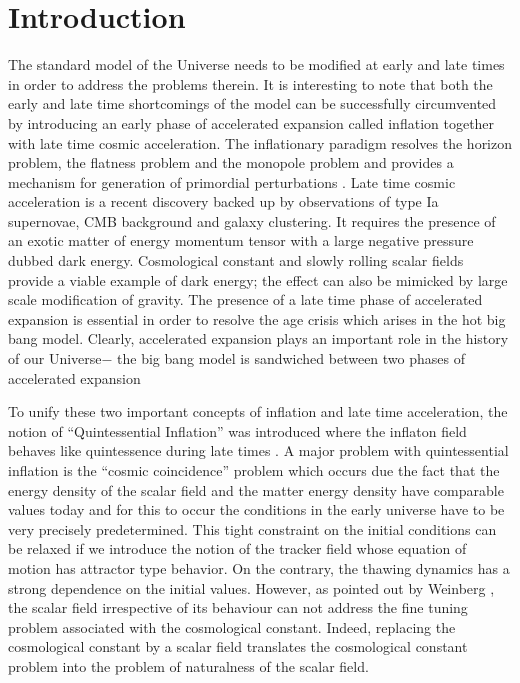 \documentclass[prd,twocolumn,superscriptaddress]{revtex4}
\begin{document}
\section{Introduction}
The standard model of the Universe needs to be modified at early and late times in order to 
address the problems therein. It is interesting to note that both the early and late time shortcomings
of the model can  be successfully  circumvented by introducing an
early phase of accelerated expansion called inflation together with
late time cosmic acceleration. The inflationary paradigm
resolves the horizon problem, the flatness problem and the monopole
problem and provides a mechanism for generation of primordial
perturbations \cite{GuthInflation,Starobinsky:1980te,Starobinsky:1982ee,Linde:1983gd,Linde:1981mu,Gasperini:1992pa,Lyth:1998xn}. Late time cosmic acceleration is
a recent discovery \cite{Perlmutter:1998np,Riess:1998dv} backed up by observations of type Ia supernovae,
CMB background and galaxy clustering. It requires the presence of an
exotic matter of energy momentum tensor with a large negative
pressure dubbed dark energy\cite{QIPeebles, Dodelson:1999am,Turner:1999kz,Amendola:2000uh,Caldwell:1999ew,Peebles:2002gy, QIRGWBSamiSahni,Copeland:2006wr}.
Cosmological constant and slowly rolling scalar fields provide a
viable example of dark energy; the effect can also be mimicked by
large scale modification of gravity. The presence of a late time phase
of accelerated expansion is essential in order to resolve the age crisis \cite{Krauss:1995yb} which arises in the hot big bang 
model. Clearly, accelerated expansion plays an important role in the history of our Universe$-$
the big bang model is sandwiched between two phases of accelerated
expansion

To unify  these two important concepts of inflation and late time acceleration, the notion
of ``Quintessential Inflation'' was
introduced where the inflaton field behaves like quintessence during late times \cite{QIPeebles,Giovannini:1999qj,Giovannini:1999bh,Giovannini:2003jw}. A major problem with
quintessential inflation is the ``cosmic coincidence'' problem which occurs due the fact that the energy density of the scalar field
and the matter energy density have comparable values today and for this to occur the conditions in the early universe have to be
very precisely predetermined. This tight constraint on the initial conditions can be relaxed if we introduce the notion of the tracker
field whose equation of motion has attractor type behavior\cite{TrackerSteinhardt, QIPlanck2015SamiWali,QIRGWBSamiSahni,RGWBISamiSahni}. 
On the contrary, the thawing dynamics has a strong dependence on the initial values. However,  as pointed out by Weinberg \cite{Weinberg:2000yb},
the scalar field irrespective of its behaviour can not address the fine tuning problem associated with the cosmological 
constant. Indeed,  replacing the cosmological constant by a scalar field translates the cosmological constant problem  into the problem of naturalness
of the scalar field.
\end{document}
